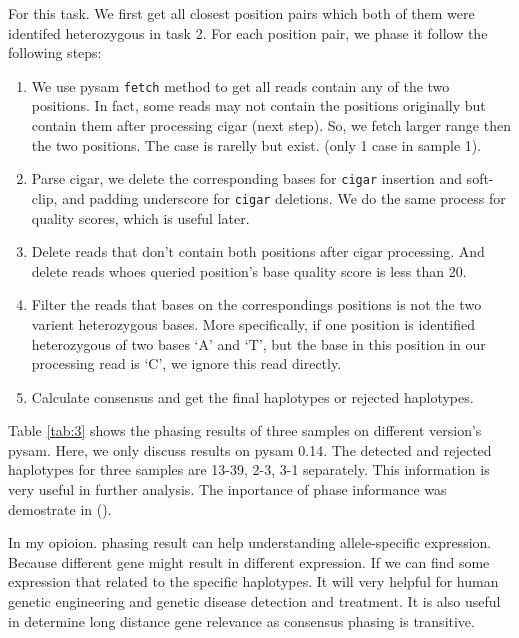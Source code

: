\documentclass[a4paper]{article}
\begin{document}
For this task. We first get all closest position pairs which both of them were identifed heterozygous in task 2. For each position pair, we phase it follow the following steps: 
\begin{enumerate}

\item We use pysam \texttt{fetch} method to get all reads contain any of the two positions. In fact, some reads may not contain the positions originally but contain them after processing cigar (next step). So, we fetch larger range then the two positions. The case is rarelly but exist. (only 1 case in sample 1).

\item Parse cigar, we delete the corresponding bases for \texttt{cigar} insertion and soft-clip, and padding underscore for \texttt{cigar} deletions. We do the same process for quality scores, which is useful later.

\item Delete reads that don't contain both positions after cigar processing. And delete reads whoes queried position's base quality score is less than 20.

\item Filter the reads that bases on the correspondings positions is not the two varient heterozygous bases. More specifically, if one position is identified heterozygous of two bases `A' and `T', but the base in this position in our processing read is `C', we ignore this read directly. 

\item Calculate consensus and get the final haplotypes or rejected haplotypes. 

\end{enumerate}

Table \ref{tab:3} shows the phasing results of three samples on different version's pysam. Here, we only discuss results on pysam 0.14. The detected and rejected haplotypes for three samples are 13-39, 2-3, 3-1 separately. This information is very useful in further analysis. The inportance of phase informance was demostrate in (\cite{Important2011}). 

In my opioion. phasing result can help understanding allele-specific expression. Because different gene might result in different expression. If we can find some expression that related to the specific haplotypes. It will very helpful for human genetic engineering and genetic disease detection and treatment. It is also useful in determine long distance gene relevance as consensus phasing is transitive. 
\end{document}
